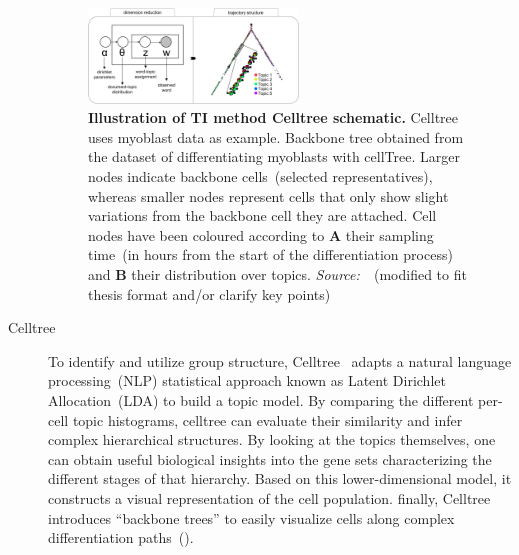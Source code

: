 \begin{description}



\begin{figure}[h!]
  	\centering
  	\includegraphics[width=0.55\textwidth]{TI_Alg_celltree/fig}
  	\vspace{0.1cm}
  	\caption[Illustration of TI method Celltree schematic.]{\textbf{Illustration of TI method Celltree schematic.} Celltree uses myoblast data as example. Backbone tree obtained from the dataset of differentiating myoblasts with cellTree. Larger nodes indicate backbone cells~(selected representatives), whereas smaller nodes represent cells that only show slight variations from the backbone cell they are attached. Cell nodes have been coloured according to \textbf{A} their sampling time~(in hours from the start of the differentiation process) and \textbf{B} their distribution over topics. \emph{Source:~\cite{duverle2016celltree}}~(modified to fit thesis format and/or clarify key points)
  	}
  	\label{fig:TI_Alg_celltree}
\end{figure}
  \item[Celltree]
  To identify and utilize group structure, Celltree~\citep{duverle2016celltree} adapts a natural language processing~(NLP) statistical approach known as Latent Dirichlet Allocation~(LDA) to build a topic model. By comparing the different per-cell topic histograms, celltree can evaluate their similarity and infer complex hierarchical structures. By looking at the topics themselves, one can obtain useful biological insights into the gene sets characterizing the different stages of that hierarchy. Based on this lower-dimensional model, it constructs a visual representation of the cell population. finally, Celltree introduces ``backbone trees'' to easily visualize cells along complex differentiation paths~().
  


\end{description}
